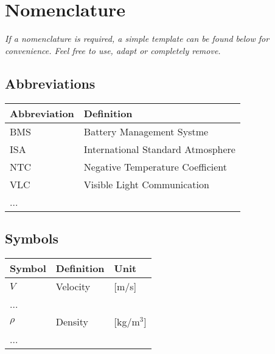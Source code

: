 \chapter*{Nomenclature}

\emph{If a nomenclature is required, a simple template can be found below for convenience. Feel free to use, adapt or completely remove.}

\section*{Abbreviations}

\begin{longtable}{p{2.5cm}p{8cm}}
    \toprule
    Abbreviation & Definition \\
    \midrule\endhead %
    BMS & Battery Management Systme \\
    ISA & International Standard Atmosphere \\
    NTC & Negative Temperature Coefficient \\
    VLC & Visible Light Communication \\

    ... \\
    \bottomrule
\end{longtable}

\section*{Symbols}

\begin{longtable}{p{2.5cm}p{8cm}p{2.5cm}}
    \toprule
    Symbol & Definition & Unit \\
    \midrule\endhead %
    $V$ & Velocity & [m/s] \\
    ... \\
    \midrule %
    $\rho$ & Density & [kg/m$^3$] \\
    ... \\
    \bottomrule
\end{longtable}